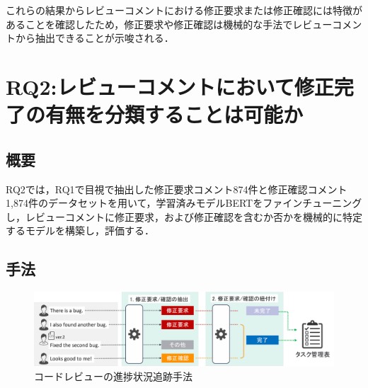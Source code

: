 \documentclass[submit,techrep,noauthor]{ipsj}
\newcommand{\RQTwo}{レビューコメントにおいて修正完了の有無を分類することは可能か}
\begin{document}

これらの結果からレビューコメントにおける修正要求または修正確認には特徴があることを確認したため，修正要求や修正確認は機械的な手法でレビューコメントから抽出できることが示唆される．

\section{RQ2:\RQTwo}\label{sec:RQ2}

\subsection{概要}
RQ2では，RQ1で目視で抽出した修正要求コメント874件と修正確認コメント1,874件のデータセットを用いて，学習済みモデルBERTをファインチューニングし，レビューコメントに修正要求，および修正確認を含むか否かを機械的に特定するモデルを構築し，評価する．

\subsection{手法}

\begin{figure}[t]
\centerline{\includegraphics[width=1.0\linewidth]{Kawasaki_fig/research_method.pdf}}
\caption{コードレビューの進捗状況追跡手法}
\label{fig:research_method}
\end{figure}
\end{document}
